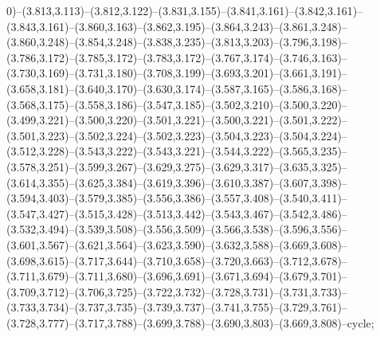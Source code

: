 0)--(3.813,3.113)--(3.812,3.122)--(3.831,3.155)--(3.841,3.161)--(3.842,3.161)--(3.843,3.161)--(3.860,3.163)--(3.862,3.195)--(3.864,3.243)--(3.861,3.248)--(3.860,3.248)--(3.854,3.248)--(3.838,3.235)--(3.813,3.203)--(3.796,3.198)--(3.786,3.172)--(3.785,3.172)--(3.783,3.172)--(3.767,3.174)--(3.746,3.163)--(3.730,3.169)--(3.731,3.180)--(3.708,3.199)--(3.693,3.201)--(3.661,3.191)--(3.658,3.181)--(3.640,3.170)--(3.630,3.174)--(3.587,3.165)--(3.586,3.168)--(3.568,3.175)--(3.558,3.186)--(3.547,3.185)--(3.502,3.210)--(3.500,3.220)--(3.499,3.221)--(3.500,3.220)--(3.501,3.221)--(3.500,3.221)--(3.501,3.222)--(3.501,3.223)--(3.502,3.224)--(3.502,3.223)--(3.504,3.223)--(3.504,3.224)--(3.512,3.228)--(3.543,3.222)--(3.543,3.221)--(3.544,3.222)--(3.565,3.235)--(3.578,3.251)--(3.599,3.267)--(3.629,3.275)--(3.629,3.317)--(3.635,3.325)--(3.614,3.355)--(3.625,3.384)--(3.619,3.396)--(3.610,3.387)--(3.607,3.398)--(3.594,3.403)--(3.579,3.385)--(3.556,3.386)--(3.557,3.408)--(3.540,3.411)--(3.547,3.427)--(3.515,3.428)--(3.513,3.442)--(3.543,3.467)--(3.542,3.486)--(3.532,3.494)--(3.539,3.508)--(3.556,3.509)--(3.566,3.538)--(3.596,3.556)--(3.601,3.567)--(3.621,3.564)--(3.623,3.590)--(3.632,3.588)--(3.669,3.608)--(3.698,3.615)--(3.717,3.644)--(3.710,3.658)--(3.720,3.663)--(3.712,3.678)--(3.711,3.679)--(3.711,3.680)--(3.696,3.691)--(3.671,3.694)--(3.679,3.701)--(3.709,3.712)--(3.706,3.725)--(3.722,3.732)--(3.728,3.731)--(3.731,3.733)--(3.733,3.734)--(3.737,3.735)--(3.739,3.737)--(3.741,3.755)--(3.729,3.761)--(3.728,3.777)--(3.717,3.788)--(3.699,3.788)--(3.690,3.803)--(3.669,3.808)--cycle;
